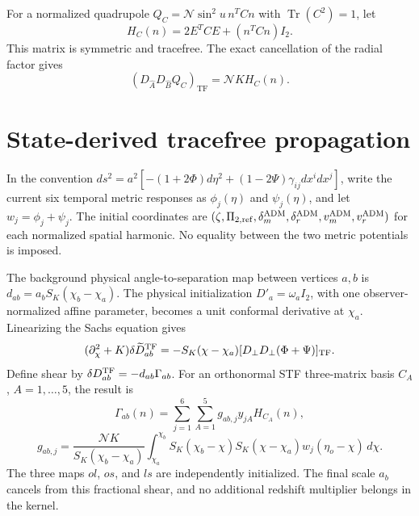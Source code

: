 For a normalized quadrupole $Q_C=\mathcal N\sin^2u\,n^TCn$ with
$\operatorname{Tr}(C^2)=1$, let
\begin{equation}
 H_C(n)=2E^TCE+(n^TCn)I_2.
 \label{eq:quadrupole-screen-shape}
\end{equation}
This matrix is symmetric and tracefree.  The exact cancellation of the
radial factor gives
\begin{equation}
 (D_{\hat A}D_{\hat B}Q_C)_{\mathrm{TF}}
 =\mathcal N K H_C(n).
 \label{eq:quadrupole-radial-cancellation}
\end{equation}

\section{State-derived tracefree propagation}
\label{sec:tracefree-transfer}

In the convention
$ds^2=a^2[-(1+2\Phi)d\eta^2+(1-2\Psi)\gamma_{ij}dx^idx^j]$,
write the current six temporal metric responses as
$\phi_j(\eta)$ and $\psi_j(\eta)$, and let
$w_j=\phi_j+\psi_j$.
The initial coordinates are
$(\zeta,\Pi_{2,\mathrm{ref}},\delta_m^{\rm ADM},\delta_r^{\rm ADM},
v_m^{\rm ADM},v_r^{\rm ADM})$ for each normalized spatial harmonic.
No equality between the two metric potentials is imposed.

The background physical angle-to-separation map between vertices $a,b$ is
$d_{ab}=a_bS_K(\chi_b-\chi_a)$.
The physical initialization $D'_a=\omega_aI_2$, with one
observer-normalized affine parameter, becomes a unit conformal derivative
at $\chi_a$.  Linearizing the Sachs equation gives
\begin{equation}
 (\partial_\chi^2+K)\delta\widetilde D_{ab}^{\rm TF}
 =-S_K(\chi-\chi_a)
 [D_\perp D_\perp(\Phi+\Psi)]_{\rm TF}.
 \label{eq:linearized-sachs-tf}
\end{equation}
Define shear by $\delta D_{ab}^{\rm TF}=-d_{ab}\Gamma_{ab}$.
For an orthonormal STF three-matrix basis $C_A$, $A=1,\ldots,5$,
the result is
\begin{equation}
 \Gamma_{ab}(n)=\sum_{j=1}^{6}\sum_{A=1}^{5}
 g_{ab,j}y_{jA}H_{C_A}(n),
 \label{eq:shear-response}
\end{equation}
\begin{equation}
 g_{ab,j}=\frac{\mathcal NK}{S_K(\chi_b-\chi_a)}
 \int_{\chi_a}^{\chi_b}S_K(\chi_b-\chi)S_K(\chi-\chi_a)
 w_j(\eta_o-\chi)\,d\chi.
 \label{eq:shear-kernel}
\end{equation}
The three maps $ol$, $os$, and $ls$ are independently initialized.
The final scale $a_b$ cancels from this fractional shear, and no additional
redshift multiplier belongs in the kernel.

